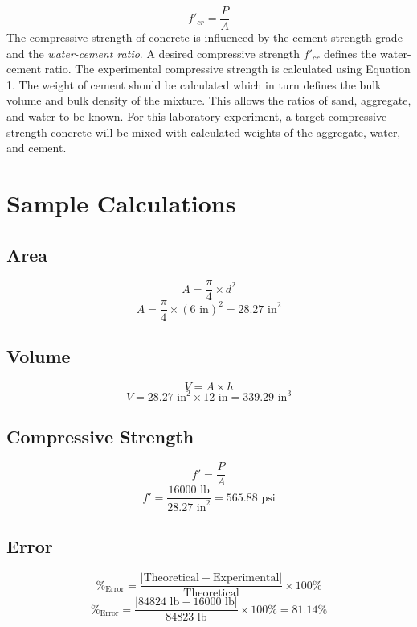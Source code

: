 \documentclass{article}
\begin{document}
    \begin{equation}
        f'_{cr}=\frac{P}{A}
    \end{equation}
    The compressive strength of concrete is influenced by the cement strength grade and the \emph{water-cement ratio}.  A desired compressive strength $f'_{cr}$ defines the water-cement ratio. The experimental compressive strength is calculated using Equation 1. The weight of cement should be calculated which in turn defines the bulk volume and bulk density of the mixture. This allows the ratios of sand, aggregate, and water to be known. For this laboratory experiment, a target compressive strength concrete will be mixed with calculated weights of the aggregate, water, and cement. 
    \newpage
    \section{Sample Calculations}
    \subsection{Area}
    \[A=\frac{\pi}{4}\times d^2\]
    \[A=\frac{\pi}{4}\times (\text{6 in})^2=\boxed{\text{28.27 in}^2}\]
    \subsection{Volume}
    \[V=A\times h\]
    \[V=\text{28.27 in}^2\times\text{12 in}=\boxed{\text{339.29 in}^3}\]
    \subsection{Compressive Strength}
    \[f'=\frac{P}{A}\]
    \[f'=\frac{\text{16000 lb}}{\text{28.27 in}^2}=\boxed{\text{565.88 psi}}\]
    \subsection{Error}
    \[\%_\text{Error}=\frac{|\text{Theoretical}-\text{Experimental}|}{\text{Theoretical}}\times 100\%\]
    \[\%_\text{Error}=\frac{|\text{84824 lb}-\text{16000 lb}|}{\text{84823 lb}}\times 100\%=\boxed{81.14\%}\]
    \newpage
\end{document}
